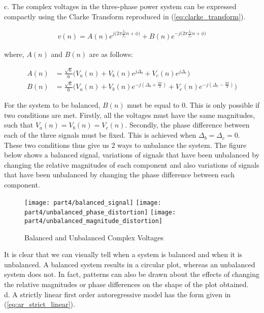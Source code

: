 \noindent{}c. The complex voltages in  the three-phase power system can be expressed compactly using the Clarke Transform reproduced in (\ref{eq:clarke_transform}).

\begin{align}
v(n) = A(n)e^{j\big(2\pi\frac{f_0}{f_s}n+\phi\big)} + B(n)e^{-j\big(2\pi\frac{f_0}{f_s}n+\phi\big)} \label{eq:clarke_transform}
\end{align}

\noindent{}where, $A(n)$ and $B(n)$ are as follows:

\begin{align*}
A(n) &= \frac{\sqrt{6}}{6}\bigg(V_a(n)+V_b(n)e^{j\Delta_b}+V_c(n)e^{j\Delta_c}\bigg) \\
B(n) &= \frac{\sqrt{6}}{6}\bigg(V_a(n)+V_b(n)e^{-j(\Delta_b + \frac{2\pi}{3})}+V_c(n)e^{-j(\Delta_c-\frac{2\pi}{3})}\bigg)
\end{align*}

\noindent{}For the system to be balanced, $B(n)$ must be equal to 0. This is only possible if two conditions are met. Firstly, all the voltages must have the same magnitudes, such that $V_a(n)=V_b(n)=V_c(n)$. Secondly, the phase difference between each of the three signals must be fixed. This is achieved when $\Delta_b=\Delta_c=0$. These two conditions thus give us 2 ways to unbalance the system. The figure below shows a balanced signal, variations of signals that have been unbalanced by changing the relative magnitudes of each component and also variations of signals that have been unbalanced by changing the phase difference between each component.  
\begin{figure}[H]
\centering{}
\texttt{[image: part4/balanced\_signal]}
\texttt{[image: part4/unbalanced\_phase\_distortion]}
\texttt{[image: part4/unbalanced\_magnitude\_distortion]}
\caption{Balanced and Unbalanced Complex Voltages}
\end{figure}

\noindent{}It is clear that we can visually tell when a system is balanced and when it is unbalanced. A balanced system results in a circular plot, whereas an unbalanced system does not. In fact, patterns can also be drawn about the effects of changing the relative magnitudes or phase differences on the shape of the plot obtained.\\

\noindent{}d. A strictly linear first order autoregressive model has the form given in (\ref{eq:ar_strict_linear}). 

